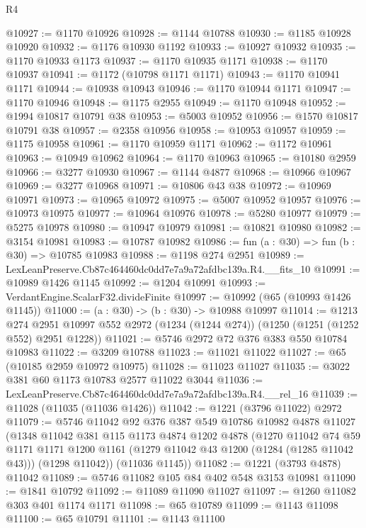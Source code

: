 \begin{lexlean}{R4}
\begin{coremodule}
@10927 := @1170 @10926
@10928 := @1144 @10788
@10930 := @1185 @10928 @10920
@10932 := @1176 @10930 @1192
@10933 := @10927 @10932
@10935 := @1170 @10933 @1173
@10937 := @1170 @10935 @1171
@10938 := @1170 @10937
@10941 := @1172 (@10798 @1171 @1171)
@10943 := @1170 @10941 @1171
@10944 := @10938 @10943
@10946 := @1170 @10944 @1171
@10947 := @1170 @10946
@10948 := @1175 @2955
@10949 := @1170 @10948
@10952 := @1994 @10817 @10791 @38
@10953 := @5003 @10952
@10956 := @1570 @10817 @10791 @38
@10957 := @2358 @10956
@10958 := @10953 @10957
@10959 := @1175 @10958
@10961 := @1170 @10959 @1171
@10962 := @1172 @10961
@10963 := @10949 @10962
@10964 := @1170 @10963
@10965 := @10180 @2959
@10966 := @3277 @10930
@10967 := @1144 @4877
@10968 := @10966 @10967
@10969 := @3277 @10968
@10971 := @10806 @43 @38
@10972 := @10969 @10971
@10973 := @10965 @10972
@10975 := @5007 @10952 @10957
@10976 := @10973 @10975
@10977 := @10964 @10976
@10978 := @5280 @10977
@10979 := @5275 @10978
@10980 := @10947 @10979
@10981 := @10821 @10980
@10982 := @3154 @10981
@10983 := @10787 @10982
@10986 := fun (a : @30) => fun (b : @30) => @10785 @10983
@10988 := @1198 @274 @2951
@10989 := LexLeanPreserve.Cb87c464460dc0dd7e7a9a72afdbc139a.R4.__fits_10
@10991 := @10989 @1426 @1145
@10992 := @1204 @10991
@10993 := VerdantEngine.ScalarF32.divideFinite
@10997 := @10992 (@65 (@10993 @1426 @1145))
@11000 := (a : @30) -> (b : @30) -> @10988 @10997
@11014 := @1213
    @274
    @2951
    @10997
    @552
    @2972
    (@1234 (@1244 @274))
    (@1250 (@1251 (@1252 @552) @2951 @1228))
@11021 := @5746 @2972 @72 @376 @383 @550 @10784 @10983
@11022 := @3209 @10788
@11023 := @11021 @11022
@11027 := @65 (@10185 @2959 @10972 @10975)
@11028 := @11023 @11027
@11035 := @3022 @381 @60 @1173 @10783 @2577 @11022 @3044
@11036 := LexLeanPreserve.Cb87c464460dc0dd7e7a9a72afdbc139a.R4.__rel_16
@11039 := @11028 (@11035 (@11036 @1426))
@11042 := @1221 (@3796 @11022) @2972
@11079 := @5746
    @11042
    @92
    @376
    @387
    @549
    @10786
    @10982
    @4878
    @11027
    (@1348
      @11042
      @381
      @115
      @1173
      @4874
      @1202
      @4878
      (@1270
        @11042
        @74
        @59
        @1171
        @1171
        @1200
        @1161
        (@1279 @11042 @43 @1200 (@1284 (@1285 @11042 @43)))
        (@1298 @11042))
      (@11036 @1145))
@11082 := @1221 (@3793 @4878) @11042
@11089 := @5746 @11082 @105 @84 @402 @548 @3153 @10981
@11090 := @1841 @10792
@11092 := @11089 @11090 @11027
@11097 := @1260 @11082 @303 @401 @1174 @1171
@11098 := @65 @10789
@11099 := @1143 @11098
@11100 := @65 @10791
@11101 := @1143 @11100

\end{coremodule}
\end{lexlean}

